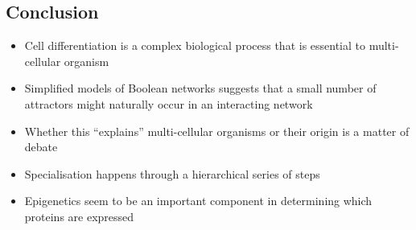 
\begin{slide}
\section{Conclusion}

\begin{PauseHighLight}
  \begin{itemize}
  \item Cell differentiation is a complex biological process that is
    essential to multi-cellular organism\pause
  \item Simplified models of Boolean networks suggests that a small
    number of attractors might naturally occur in an interacting
    network\pause
  \item Whether this ``explains'' multi-cellular organisms or their
    origin is a matter of debate\pause
  \item Specialisation happens through a hierarchical series of
    steps\pause
  \item Epigenetics seem to be an important component in determining
    which proteins are expressed\pause
  \end{itemize}
\end{PauseHighLight}

\end{slide}

